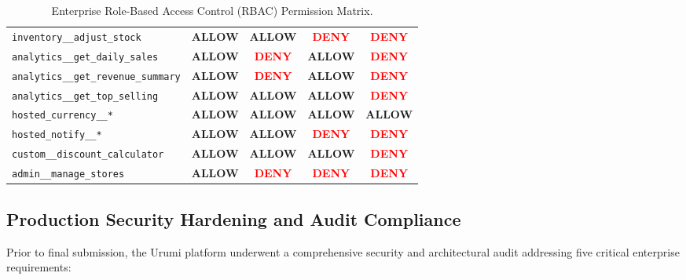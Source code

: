 \documentclass[11pt,a4paper]{article}
\begin{document}
\begin{table}[h!]
\begin{tabularx}{\textwidth}{p{3.8cm} c c c c}
\texttt{inventory\_\_adjust\_stock}        & \textcolor{accent}{\textbf{ALLOW}} & \textcolor{accent}{\textbf{ALLOW}} & \textcolor{red}{\textbf{DENY}}   & \textcolor{red}{\textbf{DENY}}   \\
\addlinespace
\texttt{analytics\_\_get\_daily\_sales}     & \textcolor{accent}{\textbf{ALLOW}} & \textcolor{red}{\textbf{DENY}}   & \textcolor{accent}{\textbf{ALLOW}} & \textcolor{red}{\textbf{DENY}}   \\
\texttt{analytics\_\_get\_revenue\_summary} & \textcolor{accent}{\textbf{ALLOW}} & \textcolor{red}{\textbf{DENY}}   & \textcolor{accent}{\textbf{ALLOW}} & \textcolor{red}{\textbf{DENY}}   \\
\texttt{analytics\_\_get\_top\_selling}    & \textcolor{accent}{\textbf{ALLOW}} & \textcolor{accent}{\textbf{ALLOW}} & \textcolor{accent}{\textbf{ALLOW}} & \textcolor{red}{\textbf{DENY}}   \\
\addlinespace
\texttt{hosted\_currency\_\_*}             & \textcolor{accent}{\textbf{ALLOW}} & \textcolor{accent}{\textbf{ALLOW}} & \textcolor{accent}{\textbf{ALLOW}} & \textcolor{accent}{\textbf{ALLOW}} \\
\texttt{hosted\_notify\_\_*}               & \textcolor{accent}{\textbf{ALLOW}} & \textcolor{accent}{\textbf{ALLOW}} & \textcolor{red}{\textbf{DENY}}   & \textcolor{red}{\textbf{DENY}}   \\
\texttt{custom\_\_discount\_calculator}    & \textcolor{accent}{\textbf{ALLOW}} & \textcolor{accent}{\textbf{ALLOW}} & \textcolor{accent}{\textbf{ALLOW}} & \textcolor{red}{\textbf{DENY}}   \\
\texttt{admin\_\_manage\_stores}           & \textcolor{accent}{\textbf{ALLOW}} & \textcolor{red}{\textbf{DENY}}   & \textcolor{red}{\textbf{DENY}}   & \textcolor{red}{\textbf{DENY}}   \\
\bottomrule
\end{tabularx}
\caption{Enterprise Role-Based Access Control (RBAC) Permission Matrix.}
\label{tab:rbac_matrix}
\end{table}

\subsection{Production Security Hardening and Audit Compliance}
Prior to final submission, the Urumi platform underwent a comprehensive security and architectural audit addressing five critical enterprise requirements:
\end{document}
